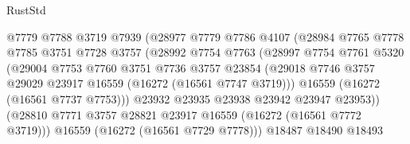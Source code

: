 \begin{lexlean}{RustStd}
\begin{coremodule}
                                @7779
                                @7788
                                @3719
                                @7939
                                (@28977
                                  @7779
                                  @7786
                                  @4107
                                  (@28984
                                    @7765
                                    @7778
                                    @7785
                                    @3751
                                    @7728
                                    @3757
                                    (@28992
                                      @7754
                                      @7763
                                      (@28997
                                        @7754
                                        @7761
                                        @5320
                                        (@29004
                                          @7753
                                          @7760
                                          @3751
                                          @7736
                                          @3757
                                          @23854
                                          (@29018
                                            @7746
                                            @3757
                                            @29029
                                            @23917
                                            @16559
                                            (@16272 (@16561 @7747 @3719)))
                                          @16559
                                          (@16272 (@16561 @7737 @7753)))
                                        @23932
                                        @23935
                                        @23938
                                        @23942
                                        @23947
                                        @23953))
                                    (@28810
                                      @7771
                                      @3757
                                      @28821
                                      @23917
                                      @16559
                                      (@16272 (@16561 @7772 @3719)))
                                    @16559
                                    (@16272 (@16561 @7729 @7778)))
                                  @18487
                                  @18490
                                  @18493

\end{coremodule}
\end{lexlean}
